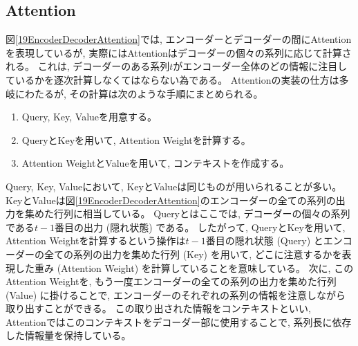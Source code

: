 \subsection{Attention} \label{DL:Atten:Attention}

図\ref{19EncoderDecoderAttention}では, エンコーダーとデコーダーの間にAttentionを表現しているが, 実際にはAttentionはデコーダーの個々の系列に応じて計算される。
これは, デコーダーのある系列$t$がエンコーダー全体のどの情報に注目しているかを逐次計算しなくてはならない為である。
Attentionの実装の仕方は多岐にわたるが, その計算は次のような手順にまとめられる。

\begin{enumerate}
  \item Query, Key, Valueを用意する。
  \item QueryとKeyを用いて, Attention Weightを計算する。
  \item Attention WeightとValueを用いて, コンテキストを作成する。
\end{enumerate}

Query, Key, Valueにおいて, KeyとValueは同じものが用いられることが多い。
KeyとValueは図\ref{19EncoderDecoderAttention}のエンコーダーの全ての系列の出力を集めた行列に相当している。
Queryとはここでは, デコーダーの個々の系列である$t-1$番目の出力 (隠れ状態) である。
したがって, QueryとKeyを用いて, Attention Weightを計算するという操作は$t-1$番目の隠れ状態 (Query) とエンコーダーの全ての系列の出力を集めた行列 (Key) を用いて, どこに注意するかを表現した重み (Attention Weight) を計算していることを意味している。
次に, このAttention Weightを, もう一度エンコーダーの全ての系列の出力を集めた行列 (Value) に掛けることで, エンコーダーのそれぞれの系列の情報を注意しながら取り出すことができる。
この取り出された情報をコンテキストといい, Attentionではこのコンテキストをデコーダー部に使用することで, 系列長に依存した情報量を保持している。

